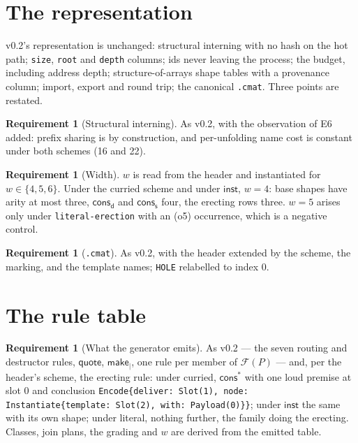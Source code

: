 \documentclass[11pt,a4paper]{article}
\newcommand{\code}[1]{\texttt{#1}}
\newcommand{\dd}{\mathsf{d}}
\newcommand{\sy}{\mathsf{s}}
\newcommand{\cons}{\mathsf{cons}}
\theoremstyle{definition}
\newtheorem{requirement}[definition]{Requirement}
\theoremstyle{plain}
\newcommand{\inst}{\mathsf{inst}}
\newcommand{\Fam}{\mathcal{F}}
\newcommand{\cstar}{\mathsf{cons}^{*}}
\begin{document}
\section{The representation}\label{sec:rep}

v0.2's representation is unchanged: structural interning with no hash on the
hot path; \code{size}, \code{root} and \code{depth} columns; ids never leaving
the process; the budget, including address depth; structure-of-arrays shape
tables with a provenance column; import, export and round trip; the
canonical \code{.cmat}. Three points are restated.

\begin{requirement}[Structural interning]\label{req:hashfree}
As v0.2, with the observation of E6 added: prefix sharing is by construction,
and per-unfolding name cost is constant under both schemes (16 and 22).
\end{requirement}

\begin{requirement}[Width]\label{req:soa}
$w$ is read from the header and instantiated for $w \in \{4,5,6\}$. Under the
curried scheme and under $\inst$, $w = 4$: base shapes have arity at most
three, $\cons_{\dd}$ and $\cons_{\sy}$ four, the erecting rows three. $w = 5$
arises only under \code{literal-erection} with an (o5) occurrence, which is a
negative control.
\end{requirement}

\begin{requirement}[\code{.cmat}]\label{req:cmat}
As v0.2, with the header extended by the scheme, the marking, and the
template names; \code{HOLE} relabelled to index $0$.
\end{requirement}

\section{The rule table}\label{sec:rules}

\begin{requirement}[What the generator emits]\label{req:gen}
As v0.2 --- the seven routing and destructor rules, $\mathsf{quote}$,
$\mathsf{make}_{\mid}$, one rule per member of $\Fam(P)$ --- and, per the
header's scheme, the erecting rule: under curried, $\cstar$ with one loud
premise at slot 0 and conclusion
\code{Encode\{deliver: Slot(1), node: Instantiate\{template: Slot(2), with:
Payload(0)\}\}}; under $\inst$ the same with its own shape; under literal,
nothing further, the family doing the erecting. Classes, join plans, the
grading and $w$ are derived from the emitted table.
\end{requirement}
\end{document}
